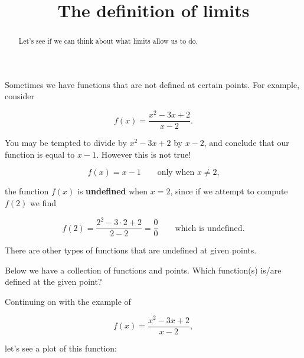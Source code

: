 \documentclass{ximera}
\title{The definition of limits}
\begin{document}
\begin{abstract}
  Let's see if we can think about what limits allow us to do.
\end{abstract}
\maketitle


Sometimes we have functions that are not defined at certain
points. For example, consider

\[
f(x) = \frac{x^2 - 3x + 2}{x-2}.
\]

You may be tempted to divide by $x^2 - 3x + 2$ by $x-2$, and conclude
that our function is equal to $x-1$. However this is not true!

\[
f(x) = x-1 \qquad\text{only when $x\ne 2$,}
\]

the function $f(x)$ is \textbf{undefined} when $x= 2$, since if we
attempt to compute $f(2)$ we find

\[
f(2) = \frac{2^2-3\cdot 2+2}{2-2} = \frac{0}{0}\qquad\text{which is  undefined}.
\]

There are other types of functions that are undefined at given points. 

\begin{question}
  Below we have a collection of functions and points. Which
  function(s) is/are defined at the given point?

\begin{multipleChoice}
\end{multipleChoice}

\end{question}


Continuing on with the example of 

\[
f(x) = \frac{x^2 - 3x + 2}{x-2},
\]

let's see a plot of this function:

\begin{image}
\end{image}
\end{document}
